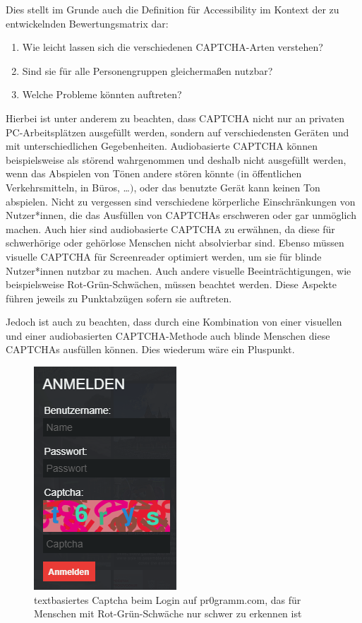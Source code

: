 Dies stellt im Grunde auch die Definition für Accessibility im Kontext der zu entwickelnden Bewertungsmatrix dar:

\begin{enumerate}
\item Wie leicht lassen sich die verschiedenen CAPTCHA-Arten verstehen?
\item Sind sie für alle Personengruppen gleichermaßen nutzbar?
\item Welche Probleme könnten auftreten?
\end{enumerate}

Hierbei ist unter anderem zu beachten, dass CAPTCHA nicht nur an privaten PC-Arbeitsplätzen ausgefüllt werden,
sondern auf verschiedensten Geräten und mit unterschiedlichen Gegebenheiten.
Audiobasierte CAPTCHA können beispielsweise als störend wahrgenommen und deshalb nicht ausgefüllt werden,
wenn das Abspielen von Tönen andere stören könnte $($in öffentlichen Verkehrsmitteln, in Büros, \dots$)$,
oder das benutzte Gerät kann keinen Ton abspielen.
Nicht zu vergessen sind verschiedene körperliche Einschränkungen von Nutzer*innen,
die das Ausfüllen von CAPTCHAs erschweren oder gar unmöglich machen. Auch hier sind audiobasierte CAPTCHA zu erwähnen,
da diese für schwerhörige oder gehörlose Menschen nicht absolvierbar sind.
Ebenso müssen visuelle CAPTCHA für Screenreader optimiert werden, um sie für blinde Nutzer*innen nutzbar zu machen.
Auch andere visuelle Beeinträchtigungen, wie beispielsweise Rot-Grün-Schwächen, müssen beachtet werden.
Diese Aspekte führen jeweils zu Punktabzügen sofern sie auftreten.

Jedoch ist auch zu beachten, dass durch eine Kombination von einer visuellen 
und einer audiobasierten CAPTCHA-Methode auch blinde Menschen diese CAPTCHAs ausfüllen können. 
Dies wiederum wäre ein Pluspunkt. 
\begin{figure}
    \centering
    \includegraphics{gfx/mygraphics/pr0grammcaptcha.png}
    \caption{textbasiertes Captcha beim Login auf pr$0$gramm.com, das für Menschen mit Rot-Grün-Schwäche nur schwer zu erkennen ist}
\end{figure}

